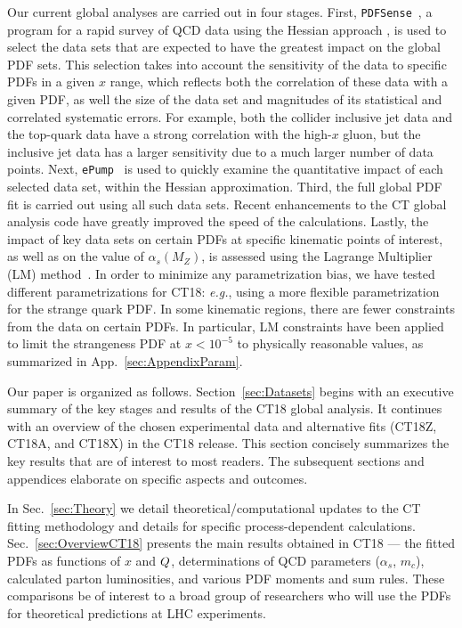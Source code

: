 Our current global analyses are carried out in four stages. First, \texttt{PDFSense}~\cite{Wang:2018heo,Hobbs:2019gob}, a program for a rapid survey of QCD data using the Hessian
approach \cite{Pumplin:2001ct,Pumplin:2002vw}, is used to select the  data sets that are expected to have the greatest impact on the global PDF sets. This selection takes into account the sensitivity of the data to specific PDFs in a given $x$ range, 
which reflects both the correlation of these data with a given PDF, as well the size of the data set and magnitudes of its statistical
and correlated systematic errors. For example, both the collider inclusive jet data and the top-quark data have a strong correlation with the high-$x$ gluon,
but the inclusive jet data has a larger sensitivity due to a much larger number of data points. Next, \texttt{ePump}~\cite{Schmidt:2018hvu,Hou:2019gfw} is used to quickly examine the quantitative
impact of each selected data set, within the Hessian approximation. Third, the full global PDF fit is carried out using all such data sets. Recent enhancements to the CT global analysis code have
greatly improved the speed of the calculations. Lastly, the impact of key data sets on certain PDFs at specific kinematic points of interest, as well as on the value of $\alpha_s(M_Z)$,
is assessed using the Lagrange Multiplier (LM) method~\cite{Stump:2001gu}. 
In order to minimize any parametrization bias, we have tested different parametrizations for CT18: {\it e.g.}, using a more flexible parametrization for the strange quark PDF.
In some kinematic regions, there are fewer constraints from the data on certain PDFs. In particular, LM constraints have been applied to limit the strangeness PDF at $x < 10^{-5}$ to
physically reasonable values, as summarized in App.~\ref{sec:AppendixParam}.

Our paper is organized as follows.
Section~\ref{sec:Datasets} begins with an executive summary of the key stages and results of the CT18 global analysis. It continues with an overview of the chosen experimental data
and alternative fits (CT18Z, CT18A, and CT18X) in the CT18 release. This section concisely summarizes the key results that are of interest to most readers. The subsequent sections and appendices elaborate on specific aspects and outcomes. 

In Sec.~\ref{sec:Theory} we detail theoretical/computational updates to the CT
fitting methodology and details for specific process-dependent calculations.
Sec.~\ref{sec:OverviewCT18} presents the main results obtained in CT18 ---
the fitted PDFs as functions of $x$ and $Q$, determinations of QCD parameters ($\alpha_s$, $m_c$), calculated parton luminosities, and various PDF moments and sum rules. These comparisons be of interest to a broad group of researchers who will use the PDFs for theoretical predictions at LHC experiments.

